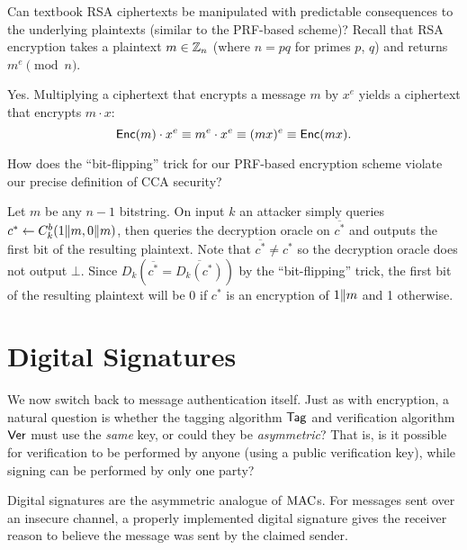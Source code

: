 \documentclass[11pt]{article}
\begin{document}
\begin{question}
  Can textbook RSA ciphertexts be manipulated with predictable
  consequences to the underlying plaintexts (similar to the PRF-based
  scheme)? Recall that RSA encryption takes a plaintext \(m \in \mathbb{Z}_n\)
  (where \(n = pq\) for primes \(p\), \(q\)) and returns
  \(m^e \pmod {n}\).
\end{question}

\begin{answer}
  Yes. Multiplying a ciphertext that encrypts a message \(m\) by
  \(x^e\) yields a ciphertext that encrypts \(m \cdot x\):
  \[ \mathsf{Enc}(m) \cdot x^e \equiv m^e \cdot x^e \equiv (mx)^e \equiv
    \mathsf{Enc}(mx) .
  \]
\end{answer}

\begin{question}
  How does the ``bit-flipping'' trick for our PRF-based encryption
  scheme violate our precise definition of CCA security?
\end{question}

\begin{answer}
  Let \(m\) be any \(n-1\) bitstring. On input \(k\) an attacker
  simply queries \(c^* \gets C_k^b(1\| m, 0 \| m)\), then
  queries the decryption oracle on \(\overline{c^*}\) and outputs the
  first bit of the resulting plaintext. Note that
  \(\overline{c^*} \neq c^*\) so the decryption oracle does not output
  \(\bot\).  Since \(D_k(\overline{c^*} = \overline{D_k(c^*)})\) by
  the ``bit-flipping'' trick, the first bit of the resulting plaintext
  will be 0 if \(c^*\) is an encryption of \(1 \| m\) and 1
  otherwise.
\end{answer}

\section{Digital Signatures}
\label{sec:digital-signatures}

We now switch back to message authentication itself.  Just as with
encryption, a natural question is whether the tagging algorithm
$\mathsf{Tag}$ and verification algorithm $\mathsf{Ver}$ must use the
\emph{same} key, or could they be \emph{asymmetric}?  That is, is it
possible for verification to be performed by anyone (using a public
verification key), while signing can be performed by only one party?

Digital signatures are the asymmetric analogue of $\text{MAC}$s. For
messages sent over an insecure channel, a properly implemented digital
signature gives the receiver reason to believe the message was sent by
the claimed sender.
\end{document}
